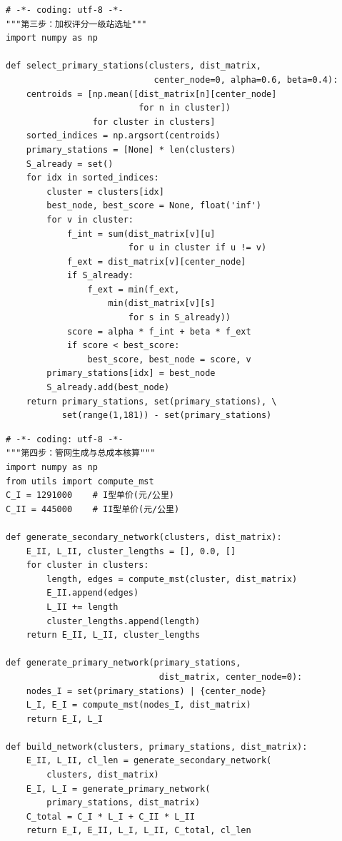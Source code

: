 \documentclass[12pt,a4paper]{ctexart}
\theoremstyle{definition}
\theoremstyle{plain}
\theoremstyle{remark}
\begin{document}
\begin{lstlisting}[caption={\texttt{station\_selection.py}：一级供水站选址}]
# -*- coding: utf-8 -*-
"""第三步：加权评分一级站选址"""
import numpy as np

def select_primary_stations(clusters, dist_matrix,
                             center_node=0, alpha=0.6, beta=0.4):
    centroids = [np.mean([dist_matrix[n][center_node]
                          for n in cluster])
                 for cluster in clusters]
    sorted_indices = np.argsort(centroids)
    primary_stations = [None] * len(clusters)
    S_already = set()
    for idx in sorted_indices:
        cluster = clusters[idx]
        best_node, best_score = None, float('inf')
        for v in cluster:
            f_int = sum(dist_matrix[v][u]
                        for u in cluster if u != v)
            f_ext = dist_matrix[v][center_node]
            if S_already:
                f_ext = min(f_ext,
                    min(dist_matrix[v][s]
                        for s in S_already))
            score = alpha * f_int + beta * f_ext
            if score < best_score:
                best_score, best_node = score, v
        primary_stations[idx] = best_node
        S_already.add(best_node)
    return primary_stations, set(primary_stations), \
           set(range(1,181)) - set(primary_stations)
\end{lstlisting}

\begin{lstlisting}[caption={\texttt{network\_design.py}：两级管网生成与成本核算}]
# -*- coding: utf-8 -*-
"""第四步：管网生成与总成本核算"""
import numpy as np
from utils import compute_mst
C_I = 1291000    # I型单价(元/公里)
C_II = 445000    # II型单价(元/公里)

def generate_secondary_network(clusters, dist_matrix):
    E_II, L_II, cluster_lengths = [], 0.0, []
    for cluster in clusters:
        length, edges = compute_mst(cluster, dist_matrix)
        E_II.append(edges)
        L_II += length
        cluster_lengths.append(length)
    return E_II, L_II, cluster_lengths

def generate_primary_network(primary_stations,
                              dist_matrix, center_node=0):
    nodes_I = set(primary_stations) | {center_node}
    L_I, E_I = compute_mst(nodes_I, dist_matrix)
    return E_I, L_I

def build_network(clusters, primary_stations, dist_matrix):
    E_II, L_II, cl_len = generate_secondary_network(
        clusters, dist_matrix)
    E_I, L_I = generate_primary_network(
        primary_stations, dist_matrix)
    C_total = C_I * L_I + C_II * L_II
    return E_I, E_II, L_I, L_II, C_total, cl_len
\end{lstlisting}
\end{document}
